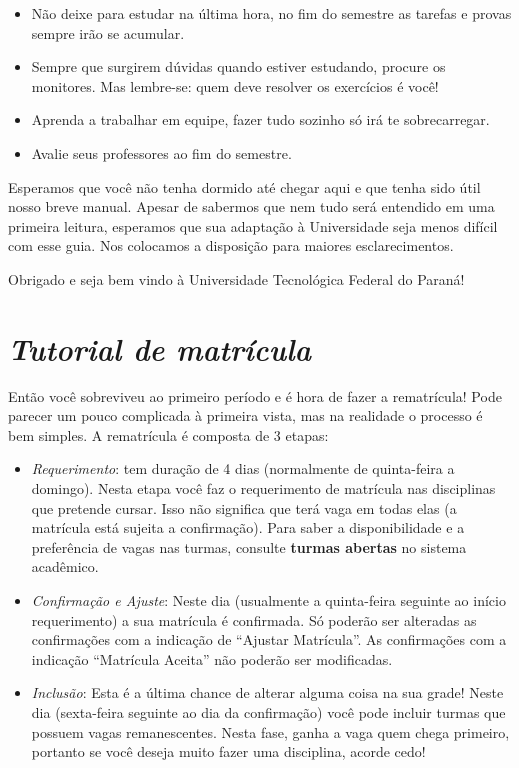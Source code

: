 \documentclass[a4paper,12pt,openany]{article}
\begin{document}
\begin{itemize}
\item Não deixe para estudar na última hora, no fim do semestre as tarefas e provas sempre irão se acumular.
\item Sempre que surgirem dúvidas quando estiver estudando, procure os monitores. Mas lembre-se: quem deve resolver os exercícios é você!
\item Aprenda a trabalhar em equipe, fazer tudo sozinho só irá te sobrecarregar.
\item Avalie seus professores ao fim do semestre.
\end{itemize}



Esperamos que você não tenha dormido até chegar aqui e que tenha sido útil nosso breve manual. Apesar de sabermos que nem tudo será entendido em uma primeira leitura, esperamos que sua adaptação à Universidade seja menos difícil com esse guia. Nos colocamos a disposição para maiores esclarecimentos.

Obrigado e seja bem vindo à Universidade Tecnológica Federal do Paraná!


\newpage
\appendix
\section{\textit{Tutorial de matrícula}} \label{app:tutorial}

Então você sobreviveu ao primeiro período e é hora de fazer a rematrícula! Pode parecer um pouco complicada à primeira vista, mas na realidade o processo é bem simples. A rematrícula é composta de 3 etapas:

\begin{itemize}
\item \textit{Requerimento}: tem duração de 4 dias (normalmente de quinta-feira a domingo). Nesta etapa você faz o requerimento de matrícula nas disciplinas que pretende cursar. Isso não significa que terá vaga em todas elas (a matrícula está sujeita a confirmação). Para saber a disponibilidade e a preferência de vagas nas turmas, consulte \textbf{turmas abertas} no sistema acadêmico.

\item \textit {Confirmação e Ajuste}: Neste dia (usualmente a quinta-feira seguinte ao início requerimento) a sua matrícula é confirmada. Só poderão ser alteradas as confirmações com a indicação de ``Ajustar Matrícula''. As confirmações com a indicação ``Matrícula Aceita'' não poderão ser modificadas.

\item \textit{Inclusão}: Esta é a última chance de alterar alguma coisa na sua grade! Neste dia (sexta-feira seguinte ao dia da confirmação) você pode incluir turmas que possuem vagas remanescentes. Nesta fase, ganha a vaga quem chega primeiro, portanto se você deseja muito fazer uma disciplina, acorde cedo!

\end{itemize}
\end{document}
